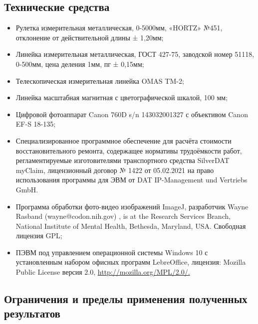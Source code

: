 \subsection{Технические средства}

\begin{itemize}
\item  Рулетка измерительная металлическая, 0-5000мм, «HORTZ» №451, отклонение от действительной длины ± 1,20мм;
\item  Линейка измерительная металлическая, ГОСТ 427-75, заводской номер 51118, 0-500мм, цена деления 1мм, пг ± 0,15мм;
\item Телескопическая измерительная линейка OMAS TM-2;
\item  Линейка масштабная магнитная с цветографической шкалой, 100 мм;
\item  Цифровой фотоаппарат  Canon 760D s/n 143032001327  с объективом Canon EF-S 18-135;
\item  Специализированное программное обеспечение для расчёта стоимости  восстановительного ремонта, содержащее нормативы трудоёмкости работ, регламентируемые изготовителями транспортного средства  SilverDAT myClaim,
лицензионный договор № 1422 от 05.02.2021 на право использования программы для ЭВМ от  DAT IP-Management und Vertriebs GmbH.
\item  Программа обработки фото-видео изображений ImageJ, разработчик  Wayne Rasband (wayne@codon.nih.gov) , is at the Research Services Branch, National Institute of Mental Health, Bethesda, Maryland, USA. Свободная лицензия GPL;
\item  ПЭВМ под управлением операционной системы Windows 10 с установленным набором офисных программ LebreOffice, лицензия: Mozilla Public License версия 2.0, \url{http://mozilla.org/MPL/2.0/.}
\end{itemize}
\subsection{Ограничения и пределы применения полученных результатов}

